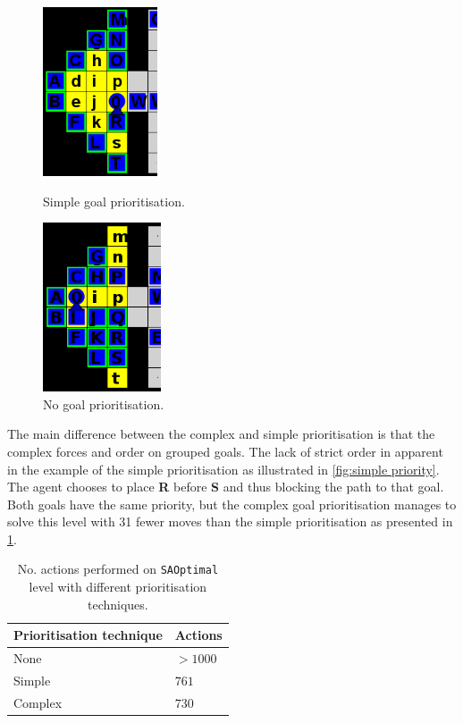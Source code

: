 \begin{figure}[h!]
  \centering
  \begin{minipage}{.45\columnwidth}
    \centering
    \includegraphics[height=5cm]{graphics/simple_priority_block.PNG}
    \caption{\label{fig:simple priority}Simple goal prioritisation.}
  \end{minipage}%
  \hspace{20pt}%
  \begin{minipage}{.45\columnwidth}
    \centering
    \includegraphics[height=5cm]{graphics/no_priority_block.png}
    \caption{\label{fig:no priority}No goal prioritisation.}
  \end{minipage}
\end{figure}

The main difference between the complex and simple prioritisation is that the complex forces and order on grouped goals.
The lack of strict order in apparent in the example of the simple prioritisation as illustrated in \cref{fig:simple priority}.
The agent chooses to place \textbf{R} before \textbf{S} and thus blocking the path to that goal.
Both goals have the same priority, but the complex goal prioritisation manages to solve this level with 31 fewer moves than the simple prioritisation as presented in \cref{tab:SAOptimal_results}.

\begin{table}[h!]
  \centering
  \begin{tabular}{@{}ll@{}}
    \toprule
    Prioritisation technique & Actions \\
    \midrule
    None    & $>1000$ \\
    Simple  & $761$ \\
    Complex & $730$ \\
    \bottomrule
  \end{tabular}
  \caption{\label{tab:SAOptimal_results}No. actions performed on \texttt{SAOptimal} level with different prioritisation techniques.}
\end{table}


